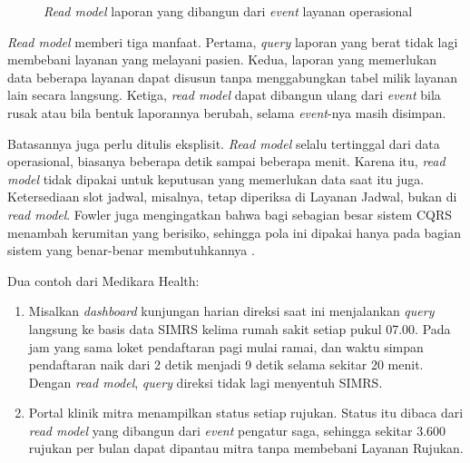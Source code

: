 \begin{figure}[!htb]
  \centering
  
  \caption{\textit{Read model} laporan yang dibangun dari \textit{event} layanan operasional}
  \label{fig:ch10-read-model}
\end{figure}

\textit{Read model} memberi tiga manfaat. Pertama, \textit{query} laporan yang berat tidak lagi
membebani layanan yang melayani pasien. Kedua, laporan yang memerlukan data beberapa layanan dapat
disusun tanpa menggabungkan tabel milik layanan lain secara langsung. Ketiga, \textit{read model}
dapat dibangun ulang dari \textit{event} bila rusak atau bila bentuk laporannya berubah, selama
\textit{event}-nya masih disimpan.

Batasannya juga perlu ditulis eksplisit. \textit{Read model} selalu tertinggal dari data
operasional, biasanya beberapa detik sampai beberapa menit. Karena itu, \textit{read model} tidak
dipakai untuk keputusan yang memerlukan data saat itu juga. Ketersediaan slot jadwal, misalnya,
tetap diperiksa di Layanan Jadwal, bukan di \textit{read model}. Fowler juga mengingatkan bahwa
bagi sebagian besar sistem CQRS menambah kerumitan yang berisiko, sehingga pola ini dipakai hanya
pada bagian sistem yang benar-benar membutuhkannya \cite{c10-fowler-cqrs}.

Dua contoh dari Medikara Health:
\begin{enumerate}
  \item Misalkan \textit{dashboard} kunjungan harian direksi saat ini menjalankan \textit{query}
        langsung ke basis data SIMRS kelima rumah sakit setiap pukul 07.00. Pada jam yang sama
        loket pendaftaran pagi mulai ramai, dan waktu simpan pendaftaran naik dari 2 detik menjadi
        9 detik selama sekitar 20 menit. Dengan \textit{read model}, \textit{query} direksi tidak
        lagi menyentuh SIMRS.
  \item Portal klinik mitra menampilkan status setiap rujukan. Status itu dibaca dari
        \textit{read model} yang dibangun dari \textit{event} pengatur saga, sehingga sekitar
        3.600 rujukan per bulan dapat dipantau mitra tanpa membebani Layanan Rujukan.
\end{enumerate}


